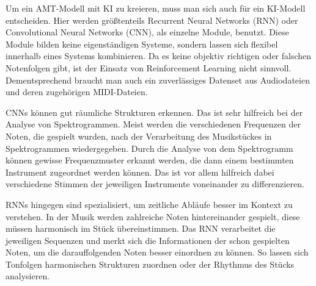 Um ein AMT-Modell mit KI zu kreieren, muss man sich auch für ein KI-Modell entscheiden.
Hier werden größtenteils Recurrent Neural Networks (RNN) oder Convolutional Neural Networks (CNN),
als einzelne Module, benutzt.
\cite{Boeck2012}
Diese Module bilden keine eigenständigen Systeme, sondern lassen sich flexibel innerhalb eines Systems kombinieren.
Da es keine objektiv richtigen oder falschen Notenfolgen gibt, ist der Einsatz von Reinforcement Learning nicht sinnvoll.
Dementsprechend braucht man auch ein zuverlässiges Datenset aus Audiodateien und deren zugehörigen MIDI-Dateien.

CNNs können gut räumliche Strukturen erkennen.
Das ist sehr hilfreich bei der Analyse von Spektrogrammen.
Meist werden die verschiedenen Frequenzen der Noten, die gespielt wurden,
nach der Verarbeitung des Musikstückes in Spektrogrammen wiedergegeben.
Durch die Analyse von dem Spektrogramm können gewisse Frequenzmuster erkannt werden,
die dann einem bestimmten Instrument zugeordnet werden können.
Das ist vor allem hilfreich dabei verschiedene Stimmen der jeweiligen Instrumente voneinander zu differenzieren.
\cite{han2016deep}

RNNs hingegen sind spezialisiert, um zeitliche Abläufe besser im Kontext zu verstehen.
In der Musik werden zahlreiche Noten hintereinander gespielt, diese müssen harmonisch im Stück übereinstimmen.
Das RNN verarbeitet die jeweiligen Sequenzen und merkt sich die Informationen der schon gespielten Noten,
um die darauffolgenden Noten besser einordnen zu können.
So lassen sich Tonfolgen harmonischen Strukturen zuordnen oder der Rhythmus des Stücks analysieren.
\cite{Boeck2012}

